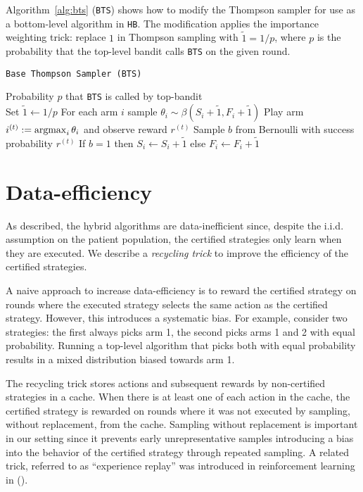 Algorithm~\ref{alg:bts} (\texttt{BTS}) shows how to modify the Thompson sampler for use as a bottom-level algorithm in \texttt{HB}. The modification applies the importance weighting trick: replace $1$ in Thompson sampling with $\tilde{1}=1/p$, where $p$ is the probability that the top-level bandit calls \texttt{BTS} on the given round. 


\begin{algorithm}[tb]
   \caption{\texttt{Base Thompson Sampler (BTS)}}
   \label{alg:bts}
   \begin{algorithmic}
   	 Probability $p$ that \texttt{BTS} is called by top-bandit\\
   	\STATE Set $\tilde{1}\leftarrow 1/p$
   	 \STATE For each arm $i$ sample $\theta_i\sim\beta(S_i +\tilde{1},F_i +\tilde{1})$
	\STATE Play arm $i^{(t)} := \operatorname*{argmax}_i \theta_i$ and observe reward $r^{(t)}$
	\STATE Sample $b$ from Bernoulli with success probability $r^{(t)}$
	\STATE If $b=1$ then $S_i \leftarrow S_i + \tilde{1}$ else $F_i\leftarrow F_i+\tilde{1}$
   	\end{algorithmic}
\end{algorithm}




\section{Data-efficiency}

As described, the hybrid algorithms are data-inefficient since, despite the i.i.d. assumption on the patient population, the certified strategies only learn when they are executed. We describe a \emph{recycling trick} to improve the efficiency of the certified strategies. 

A naive approach to increase data-efficiency is to reward the certified strategy on rounds where the executed strategy selects the same action as the certified strategy. However, this introduces a systematic bias. For example, consider two strategies: the first always picks arm 1, the second picks arms 1 and 2 with equal probability. Running a top-level algorithm that picks both with equal probability results in a mixed distribution biased towards arm 1.

The recycling trick stores actions and subsequent rewards by non-certified strategies in a cache. When there is at least one of each action in the cache, the certified strategy is rewarded on rounds where it was not executed by sampling, without replacement, from the cache. Sampling without replacement is important in our setting since it prevents early unrepresentative samples introducing a bias into the behavior of the certified strategy through repeated sampling. A related trick, referred to as ``experience replay'' was introduced in reinforcement learning in (\cite{Mnih:2015wq}). 
